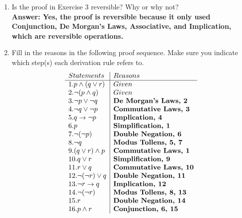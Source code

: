 \documentclass[12pt]{article}
\begin{document}
\begin{enumerate}
\item
Is the proof in Exercise 3 reversible? Why or why not?\\
\textbf{Answer: Yes, the proof is reversible because it only used Conjunction, De Morgan's Laws, Associative, and Implication, which are reversible operations.}

\item
Fill in the reasons in the following proof sequence. Make sure you indicate which step(s) each derivation rule refers to.
\begin{displaymath}
    \begin{array}{l|l c|c|c|c|c|}
    Statements & Reasons \\%
    \hline %
    1. p \wedge (q \vee r) & Given \\
    2. \neg (p \wedge q) & Given \\
    3. \neg p \vee \neg q & \textbf{De Morgan's Laws, 2} \\
    4. \neg q \vee \neg p & \textbf{Commutative Laws, 3} \\
    5. q \rightarrow \neg p & \textbf{Implication, 4}\\
    6. p & \textbf{Simplification, 1}\\ 
    7. \neg (\neg p) & \textbf{Double Negation, 6}\\
    8. \neg q & \textbf{Modus Tollens, 5, 7} \\
    9. (q \vee r) \wedge p & \textbf{Commutative Laws, 1}\\
    10. q \vee r & \textbf{Simplification, 9}\\
    11. r \vee q & \textbf{Commutative Laws, 10}\\
    12. \neg (\neg r) \vee q & \textbf{Double Negation, 11}\\
    13. \neg r \rightarrow q & \textbf{Implication, 12}\\
    14. \neg(\neg r) & \textbf{Modus Tollens, 8, 13}\\
    15. r & \textbf{Double Negation, 14}\\
    16. p \wedge r& \textbf{Conjunction, 6, 15}\\
    \end{array}
  \end{displaymath}


\end{enumerate}
\end{document}
